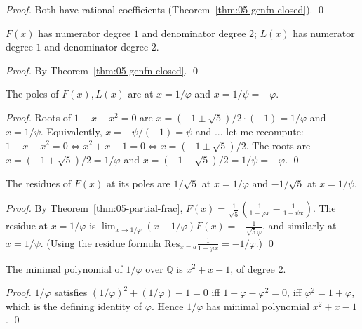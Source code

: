 \begin{proof}
Both have rational coefficients (Theorem~\ref{thm:05-genfn-closed}). \qed
\end{proof}

\begin{lemma}
\label{fa_05:lem:05-degree}
$F(x)$ has numerator degree $1$ and denominator degree $2$;
$L(x)$ has numerator degree $1$ and denominator degree $2$.
\end{lemma}

\begin{proof}
By Theorem~\ref{thm:05-genfn-closed}. \qed
\end{proof}

\begin{lemma}
\label{fa_05:lem:05-pole-locations}
The poles of $F(x), L(x)$ are at $x = 1/\varphi$ and $x = 1/\psi = -\varphi$.
\end{lemma}

\begin{proof}
Roots of $1 - x - x^2 = 0$ are $x = (-1 \pm \sqrt{5})/2 \cdot (-1) = 1/\varphi$
and $x = 1/\psi$. Equivalently, $x = -\psi/(-1) = \psi$ and ... let me
recompute: $1 - x - x^2 = 0 \iff x^2 + x - 1 = 0 \iff x = (-1 \pm \sqrt{5})/2$.
The roots are $x = (-1 + \sqrt{5})/2 = 1/\varphi$ and
$x = (-1 - \sqrt{5})/2 = 1/\psi = -\varphi$. \qed
\end{proof}

\begin{lemma}
\label{fa_05:lem:05-pole-residue}
The residues of $F(x)$ at its poles are $1/\sqrt{5}$ at $x = 1/\varphi$
and $-1/\sqrt{5}$ at $x = 1/\psi$.
\end{lemma}

\begin{proof}
By Theorem~\ref{thm:05-partial-frac}, $F(x) = \frac{1}{\sqrt{5}} (\frac{1}{1-\varphi x}
- \frac{1}{1-\psi x})$. The residue at $x = 1/\varphi$ is
$\lim_{x \to 1/\varphi} (x - 1/\varphi) F(x) = -\frac{1}{\sqrt{5}\varphi}$, and
similarly at $x = 1/\psi$. (Using the residue formula
$\mathrm{Res}_{x=a} \frac{1}{1-\varphi x} = -1/\varphi$.) \qed
\end{proof}

\begin{lemma}
\label{fa_05:lem:05-degree-Q-phi}
The minimal polynomial of $1/\varphi$ over $\mathbb{Q}$ is $x^2 + x - 1$,
of degree $2$.
\end{lemma}

\begin{proof}
$1/\varphi$ satisfies $(1/\varphi)^2 + (1/\varphi) - 1 = 0$ iff
$1 + \varphi - \varphi^2 = 0$, iff $\varphi^2 = 1 + \varphi$, which is the
defining identity of $\varphi$. Hence $1/\varphi$ has minimal polynomial
$x^2 + x - 1$. \qed
\end{proof}


